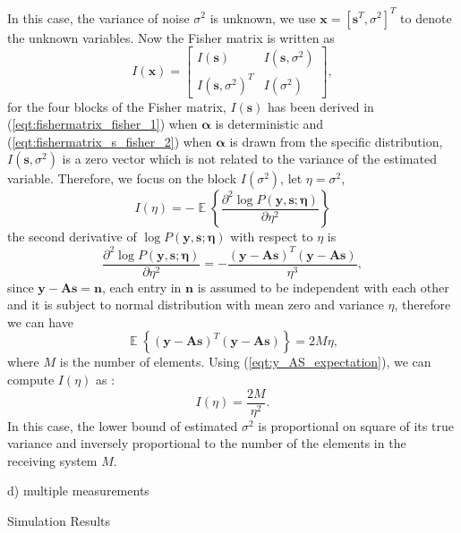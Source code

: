 \documentclass[proposal]{umthesis}          %
\begin{document}
\noindent
In this case, the variance of noise $\sigma^{2}$ is unknown, we use $\mathbf{x} = [\mathbf{s}^{T}, \sigma^2]^{T}$ to denote the unknown variables. Now the Fisher matrix is written as  
\begin{equation}
I(\boldsymbol{x}) = \begin{bmatrix}
I(\mathbf{s}) & I(\mathbf{s},\sigma^{2}) \\ 
I(\mathbf{s},\sigma ^{2})^{T} & I(\sigma^{2})
\end{bmatrix},
\end{equation}
for the four blocks of the Fisher matrix, $I(\mathbf{s})$ has been derived in (\ref{eqt:fishermatrix_fisher_1}) when $\mathbf{\alpha}$ is deterministic and (\ref{eqt:fishermatrix_s_fisher_2}) when $\mathbf{\alpha}$ is drawn from the specific distribution, $I(\mathbf{s},\sigma^{2})$ is a zero vector which is not related to the variance of the estimated variable. Therefore, we focus on the block $I(\sigma^{2})$, let $\eta = \sigma^{2}$, 
\begin{equation}
I(\eta) = - \mathop{\mathbb{E}} \left \{ \frac{\partial^{2} \log P(\mathbf{y,s;\eta})}{\partial \eta ^{2}} \right \}
\end{equation}
the second derivative of $\log P(\mathbf{y,s;\eta})$ with respect to $\eta$ is
\begin{equation}
\frac{\partial^{2} \log P(\mathbf{y,s;\eta})}{\partial \eta^{2}} = -\frac{(\mathbf{y-As})^{T}(\mathbf{y-As})}{\eta^{3}},
\end{equation}
since $\mathbf{y-As} = \mathbf{n}$, each entry in $\mathbf{n}$ is assumed to be independent with each other and it is subject to normal distribution with mean zero and variance $\eta$, therefore we can have 
\begin{equation} \label{eqt:y_AS_expectation}
\mathop{\mathbb{E}} \left \{ (\mathbf{y-As})^{T}(\mathbf{y-As}) \right \} = 2M\eta,
\end{equation}
where $M$ is the number of elements. Using (\ref{eqt:y_AS_expectation}), we can compute $I(\eta)$ as :
\begin{equation} \label{eqt:fisher_matrix_block_sigma_fisher_3}
I(\eta) = \frac{2M}{\eta^{2}}.
\end{equation}
In this case, the lower bound of estimated $\sigma^{2}$ is proportional on square of its true variance and inversely proportional to the number of the elements in the receiving system $M$.

\noindent
d) multiple measurements

\noindent
Simulation Results 
\end{document}
